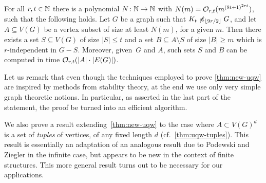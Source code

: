 \begin{theorem}\label{thm:new-uqw}
For all $r,t\in \mathbb{N}$ there is a polynomial  $N\colon \mathbb{N}\to \mathbb{N}$ with $N(m)=
\mathcal{O}_{r,t}{(m^{{(8t+1)}^{2rt}})}$, such that the following holds.
Let $G$ be a graph such that $K_t\not\preccurlyeq_{\lfloor 9r/2\rfloor} G$, and
let $A\subseteq V(G)$ be a vertex subset of size at least $N(m)$, for a given $m$.
Then there exists a set $S\subseteq V(G)$ of size $|S|\leq t$ and a set $B\subseteq A\setminus S$ 
of size $|B|\geq m$ which is $r$-independent in $G-S$.
Moreover, given~$G$ and $A$, such sets $S$ and $B$ can be computed in time $\mathcal{O}_{r,t}(|A|\cdot |E(G)|)$. 
\end{theorem}

Let us remark
that even though the techniques employed to prove \cref{thm:new-uqw} are inspired by methods from stability theory, 
at the end we use only very simple graph theoretic notions. In particular, as asserted in the last part of the statement, the
proof  be turned into an efficient algorithm.

We also prove a result extending~\cref{thm:new-uqw}
to the case where $A\subset V(G)^d$ is a set of \emph{tuples} of vertices, of any fixed length $d$ (cf.~\cref{thm:uqw-tuples}).
This result is essentially an adaptation of an analogous result due to Podewski and Ziegler in the infinite case,
but appears to be new in the context of finite structures.
This more general result turns out to be necessary for our applications.

